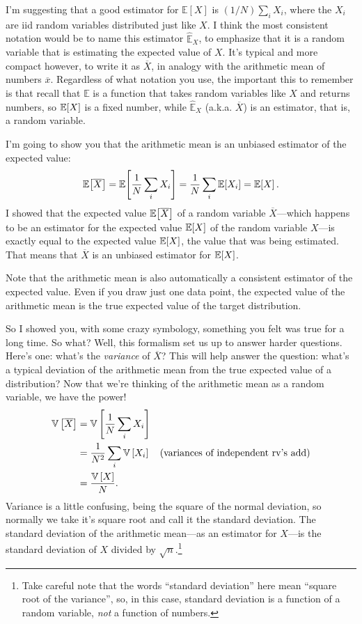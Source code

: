 I'm suggesting that a good estimator for $\mathbb{E}[X]$ is $(1/N)\sum_i X_i$,
where the $X_i$ are iid random variables distributed just like $X$. I think
the most consistent notation would be to name this estimator
$\hat{\mathbb{E}}_X$, to emphasize that it is a random variable that is
estimating the expected value of $X$. It's typical and more compact however,
to write it as $\overline{X}$, in analogy with the arithmetic mean of numbers
$\overline{x}$. Regardless of what notation you use, the important this to
remember is that recall that $\mathbb{E}$ is a function that takes random
variables like $X$ and returns numbers, so $\mathbb{E}\!\left[{X}\right]$ is a fixed number,
while $\hat{\mathbb{E}}_X$ (a.k.a. $\overline{X}$) is an estimator, that is, a
random variable.

I'm going to show you that the arithmetic mean is an
unbiased estimator of the expected value:
\begin{equation}
\mathbb{E}\!\left[{\overline{X}}\right] = \mathbb{E}\!\left[{\frac{1}{N} \sum_i X_i}\right] = \frac{1}{N} \sum_i \mathbb{E}\!\left[{X_i}\right] = \mathbb{E}\!\left[{X}\right].
\end{equation}
I showed that the expected value $\mathbb{E}\!\left[{\overline{X}}\right]$ of a random variable
$\overline{X}$---which happens to be an estimator for the expected value
$\mathbb{E}\!\left[{X}\right]$ of the random variable $X$---is exactly equal to the expected
value $\mathbb{E}\!\left[{X}\right]$, the value that was being estimated. That means that $\overline{X}$
is an unbiased estimator for $\mathbb{E}\!\left[{X}\right]$.

Note that the arithmetic mean is also automatically a consistent estimator of
the expected value. Even if you draw just one data point, the expected value
of the arithmetic mean is the true expected value of the target distribution.

So I showed you, with some crazy symbology, something you felt was true for a
long time. So what? Well, this formalism set us up to answer harder questions.
Here's one: what's the \emph{variance} of $\overline{X}$? This will help
answer the question: what's a typical deviation of the arithmetic mean from
the true expected value of a distribution? Now that we're thinking of the
arithmetic mean as a random variable, we have the power!
\begin{align}\label{eq:sem}
\mathbb{V}\left[{\overline{X}}\right] &= \mathbb{V}\left[{\frac{1}{N} \sum_i X_i}\right] \nonumber\\
  &= \frac{1}{N^2} \sum_i \mathbb{V}\left[{X_i}\right] \quad\text{(variances of independent rv's add)} \nonumber\\
  &= \frac{\mathbb{V}\left[{X}\right]}{N}.
\end{align}
Variance is a little confusing, being the square of the normal deviation, so
normally we take it's square root and call it the standard deviation. The
standard deviation of the arithmetic mean---as an estimator for $X$---is the
standard deviation of $X$ divided by $\sqrt{n}$.\footnote{Take careful note
that the words ``standard deviation'' here mean ``square root of the variance'',
so, in this case, standard deviation is a function of a random variable, \emph{not}
a function of numbers.}

